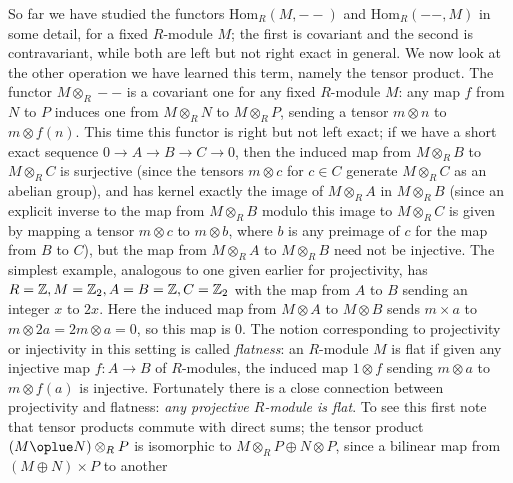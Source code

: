 So far we have studied the functors Hom$_R(M,--)$ and Hom$_R(--,M)$ in some detail, for a fixed $R$-module $M$; the first is covariant and the second is contravariant, while both are left but not right exact in general.  We now look at the other operation we have learned this term, namely the tensor product.  The functor $M\otimes_R --$ is a covariant one for any fixed $R$-module $M$:  any map $f$ from $N$ to $P$ induces one from $M\otimes_R N$ to $M\otimes_R P$, sending a tensor
$m\otimes n$ to $m\otimes f(n)$.  This time this functor is right but not left exact; if we have a short
exact sequence $0\rightarrow A\rightarrow B\rightarrow C\rightarrow 0$, then the induced map from
$M\otimes_R B$ to $M\otimes_R C$ is surjective (since the tensors $m\otimes c$ for $c\in C$ generate $M\otimes_R C$ as an abelian group), and has kernel exactly the image of $M\otimes_R A$ in $M\otimes_R B$ (since an explicit inverse to the map from $M\otimes_R B$ modulo this image to
$M\otimes_R C$ is given by mapping a tensor $m\otimes c$ to $m\otimes b$, where $b$ is any preimage of $c$ for the map from $B$ to $C$), but the map from $M\otimes_R A$ to $M\otimes_R B$ need not be injective.  The simplest example, analogous to one given earlier for projectivity, has
$R=\Bbb Z, M=\Bbb Z_2,A=B=\Bbb Z,C=\Bbb Z_2$ with the map from $A$ to $B$ sending an integer $x$ to $2x$.  Here the induced map from $M\otimes A$ to $M\otimes B$ sends $m\times a$ to
$m\otimes 2a = 2m\otimes a = 0$, so this map is 0.  The notion corresponding to projectivity or injectivity in this setting is called {\sl flatness}:  an $R$-module $M$ is flat if given any injective map
$f:A\rightarrow B$ of $R$-modules, the induced map $1\otimes f$ sending $m\otimes a$ to
$m\otimes f(a)$ is injective.  Fortunately there is a close connection between projectivity and flatness:  {\sl any projective $R$-module is flat}.  To see this first note that tensor products commute with direct sums; the tensor product $(M\oplue N)\otimes_R P$ is isomorphic to
$M\otimes_R P\oplus N\otimes P$, since a bilinear map from $(M\oplus N) \times P$ to another
